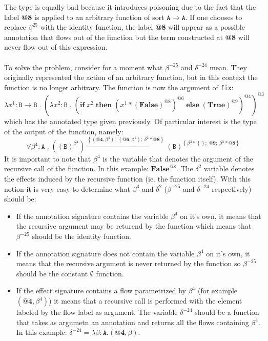 \documentclass[8pt]{extarticle}
\begin{document}
The type is equally bad because it introduces poisoning due to the fact that the label {\bf @8} is applied to an arbitrary function of sort $\mathtt{A}\to\mathtt{A}$. If one chooses to replace $\beta^{25}$ with the identity function, the label {\bf @8} will appear as a possible annotation that flows out of the function but the term constructed at {\bf @8} will never flow out of this expression.
\\\\
To solve the problem, consider for a moment what $\beta^{-25}$ and $\delta^{-24}$ mean. They originally represented the action of an arbitrary function, but in this context the function is no longer arbitrary. The function is now the argument of \verb+fix+:
\[
\lambda{}x^{1}:\mathtt{B}\to{}\mathtt{B}\;{}.\;{}\left(\lambda{}x^{2}:\mathtt{B}\;{}.\;{}\left(\mathbf{if}\;{}x^{2}\;{}\mathbf{then}\;{}\left(x^{1}*\left(\mathbf{False}\right)^{\mathit{@8}}\right)^{\mathit{@6}}\;{}\mathbf{else}\;{}\left(\mathbf{True}\right)^{\mathit{@9}}\right)^{\mathit{@4}}\right)^{\mathit{@3}}
\]
which has the annotated type given previously. Of particular interest is the type of the output of the function, namely:
\[
\forall{}\beta{}^{4}:\mathtt{A}\;{}.\;{}\left(\left(\mathtt{B}\right)^{\beta{}^{4}}\right)\xrightarrow{\left\{\left(\textbf{@4},\beta{}^{4}\right);\;{}\left(\textbf{@6},\beta{}^{1}\right);\;{}\delta{}^{2}*\textbf{@8}\right\}}\left(\mathtt{B}\right)^{\left\{\beta{}^{3}*\left\{\right\};\;{}\textbf{@9};\;{}\beta{}^{3}*\textbf{@8}\right\}}
\]
It is important to note that $\beta^{4}$ is the variable that denotes the argument of the recursive call of the function. In this example: $\mathbf{False}^{\mathit{@8}}$. The $\delta^2$ variable denotes the effects induced by the recursive function (ie. the function itself). With this notion it is very easy to determine what $\beta^{3}$ and $\delta^{2}$ ($\beta^{-25}$ and $\delta^{-24}$ respectively) should be:
\begin{itemize}
\item If the annotation signature contains the variable $\beta^{4}$ on it's own, it means that the recursive argument may be returend by the function which means that $\beta^{-25}$ should be the identity function.
\item If the annotation signature does not contain the variable $\beta^{4}$ on it's own, it means that the recursive argument is never returned by the function so $\beta^{-25}$ should be the constant $\emptyset$ function.
\item If the effect signature contains a flow parametrized by $\beta^{4}$ (for example $\left(\mathbf{@4},\beta^{4}\right)$) it means that a recursive call is performed with the element labeled by the flow label as argument. The variable $\delta^{-24}$ should be a function that takes as argumetn an annotation and returns all the flows containing $\beta^4$. In this example: $\delta^{-24}=\lambda\beta:\mathtt{A}.\left(\mathbf{@4},\beta\right)$.
\end{itemize}
\end{document}
